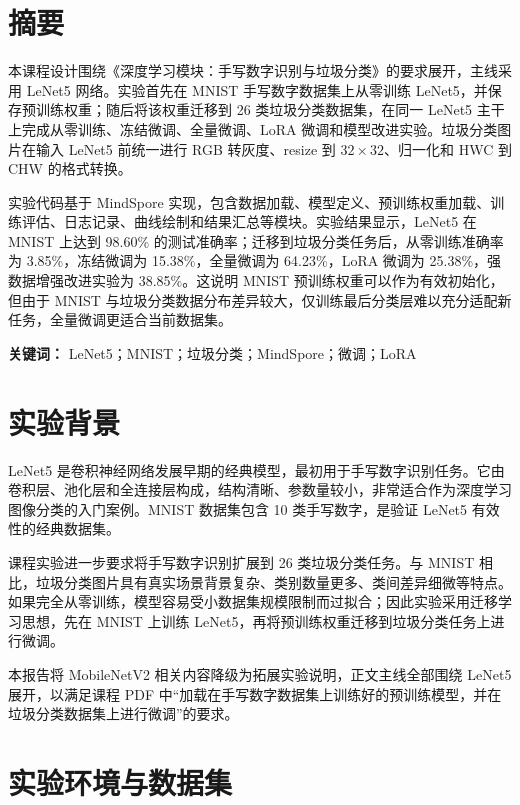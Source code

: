 \documentclass[UTF8,a4paper,zihao=-4]{ctexbook}
\begin{document}
\frontmatter

\chapter*{摘要}

本课程设计围绕《深度学习模块：手写数字识别与垃圾分类》的要求展开，主线采用 LeNet5 网络。实验首先在 MNIST 手写数字数据集上从零训练 LeNet5，并保存预训练权重；随后将该权重迁移到 26 类垃圾分类数据集，在同一 LeNet5 主干上完成从零训练、冻结微调、全量微调、LoRA 微调和模型改进实验。垃圾分类图片在输入 LeNet5 前统一进行 RGB 转灰度、resize 到 $32 \times 32$、归一化和 HWC 到 CHW 的格式转换。

实验代码基于 MindSpore 实现，包含数据加载、模型定义、预训练权重加载、训练评估、日志记录、曲线绘制和结果汇总等模块。实验结果显示，LeNet5 在 MNIST 上达到 98.60\% 的测试准确率；迁移到垃圾分类任务后，从零训练准确率为 3.85\%，冻结微调为 15.38\%，全量微调为 64.23\%，LoRA 微调为 25.38\%，强数据增强改进实验为 38.85\%。这说明 MNIST 预训练权重可以作为有效初始化，但由于 MNIST 与垃圾分类数据分布差异较大，仅训练最后分类层难以充分适配新任务，全量微调更适合当前数据集。

\vspace{1em}
\noindent\textbf{关键词：} LeNet5；MNIST；垃圾分类；MindSpore；微调；LoRA

\tableofcontents

\mainmatter

\chapter{实验背景}

LeNet5 是卷积神经网络发展早期的经典模型，最初用于手写数字识别任务。它由卷积层、池化层和全连接层构成，结构清晰、参数量较小，非常适合作为深度学习图像分类的入门案例。MNIST 数据集包含 10 类手写数字，是验证 LeNet5 有效性的经典数据集。

课程实验进一步要求将手写数字识别扩展到 26 类垃圾分类任务。与 MNIST 相比，垃圾分类图片具有真实场景背景复杂、类别数量更多、类间差异细微等特点。如果完全从零训练，模型容易受小数据集规模限制而过拟合；因此实验采用迁移学习思想，先在 MNIST 上训练 LeNet5，再将预训练权重迁移到垃圾分类任务上进行微调。

本报告将 MobileNetV2 相关内容降级为拓展实验说明，正文主线全部围绕 LeNet5 展开，以满足课程 PDF 中“加载在手写数字数据集上训练好的预训练模型，并在垃圾分类数据集上进行微调”的要求。

\chapter{实验环境与数据集}
\end{document}

